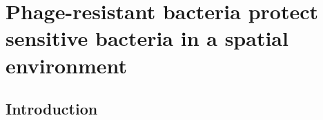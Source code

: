 \part{Phage-resistant bacteria protect sensitive bacteria in a spatial environment}
\chapter{Introduction}
\label{chap:intro}









